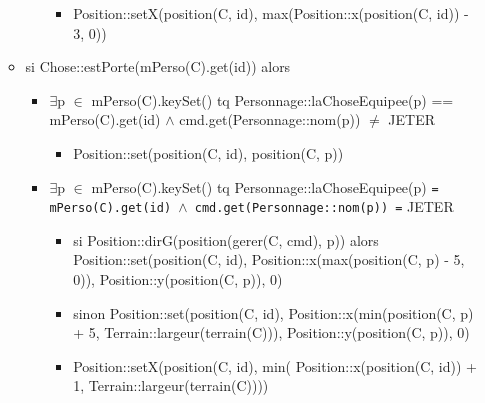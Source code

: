 \documentclass[11pt]{article}
\begin{document}
\begin{itemize}
\begin{itemize}
\begin{itemize}
\begin{itemize}
\item Position::setX(position(C, id), max(Position::x(position(C, id)) - 3, 0))\\
\label{sec-1.7.3.6.1.2.1}


\end{itemize} %
\end{itemize} %

\item si Chose::estPorte(mPerso(C).get(id)) alors\\
\label{sec-1.7.3.6.2}

\begin{itemize}

\item $\exists$p $\in$ mPerso(C).keySet() tq Personnage::laChoseEquipee(p) == mPerso(C).get(id) $\wedge$ cmd.get(Personnage::nom(p)) $\neq$ JETER\\
\label{sec-1.7.3.6.2.1}

\begin{itemize}

\item Position::set(position(C, id), position(C, p))\\
\label{sec-1.7.3.6.2.1.1}

\end{itemize} %

\item $\exists$p $\in$ mPerso(C).keySet() tq Personnage::laChoseEquipee(p) \texttt{= mPerso(C).get(id) $\wedge$ cmd.get(Personnage::nom(p)) =} JETER\\
\label{sec-1.7.3.6.2.2}

\begin{itemize}

\item si Position::dirG(position(gerer(C, cmd), p)) alors Position::set(position(C, id), Position::x(max(position(C, p) - 5, 0)), Position::y(position(C, p)), 0)\\
\label{sec-1.7.3.6.2.2.1}


\item sinon Position::set(position(C, id), Position::x(min(position(C, p) + 5, Terrain::largeur(terrain(C))), Position::y(position(C, p)), 0)\\
\label{sec-1.7.3.6.2.2.2}



\item Position::setX(position(C, id), min( Position::x(position(C, id)) + 1, Terrain::largeur(terrain(C))))\\
\label{sec-1.7.3.6.3.1}



\end{itemize}
\end{itemize}
\end{itemize}
\end{itemize}
\end{document}
